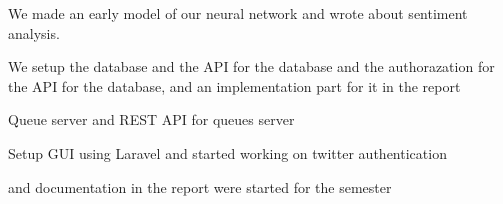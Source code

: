 We made an early model of our neural network and wrote about sentiment analysis.

We setup the database and the API for the database and the authorazation for the
API for the database, and an implementation part for it in the report

Queue server and REST API for queues server

Setup GUI using Laravel and started working on twitter authentication

and documentation in the report were started for the semester
